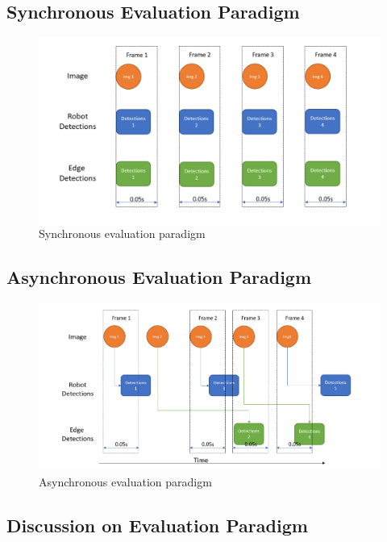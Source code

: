 
\subsection{Synchronous Evaluation Paradigm}

\begin{figure}[htp]
    \centering
    \includegraphics[width=120mm]{figures/setup/sync_eval.png}
    \caption{Synchronous evaluation paradigm}
    \label{fig:sync_eval}
\end{figure}

\subsection{Asynchronous Evaluation Paradigm}

\begin{figure}[htp]
    \centering
    \includegraphics[width=120mm]{figures/setup/async_eval.png}
    \caption{Asynchronous evaluation paradigm}
    \label{fig:async_eval}
\end{figure}

\subsection{Discussion on Evaluation Paradigm}
